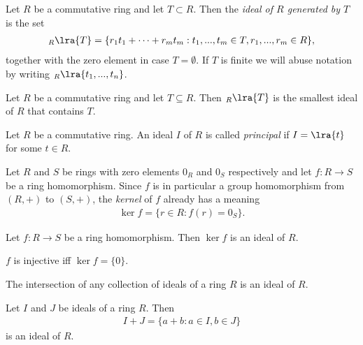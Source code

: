 \documentclass{article}
\begin{document}
\begin{definition}
    Let $R$ be a commutative ring and let $T\subset R$. Then the \emph{ideal of $R$
    generated by $T$} is the set 
    \begin{align*}
        _R\lra{T} = \{r_1t_1+\cdots+r_mt_m : t_1,...,t_m\in T,r_1,...,r_m\in R\},
    \end{align*}
    together with the zero element in case $T=\emptyset$. If $T$ is finite we will 
    abuse notation by writing $_R\lra{t_1,...,t_n}$.
\end{definition}

\begin{proposition}[Notes 3.4.14]
    Let $R$ be a commutative ring and let $T\subseteq R$. Then $_R\lra{T}$ is the 
    smallest ideal of $R$ that contains $T$. 
\end{proposition}

\begin{definition}
    Let $R$ be a commutative ring. An ideal $I$ of $R$ is called \emph{principal} if 
    $I=\lra{t}$ for some $t\in R$.
\end{definition}

\begin{definition}
    Let $R$ and $S$ be rings with zero elements $0_R$ and $0_S$ respectively and 
    let $f:R\to S$ be a ring homomorphism. Since $f$ is in particular a group homomorphism
    from $(R,+)$ to $(S,+)$, the \emph{kernel} of $f$ already has a meaning 
    \begin{align*}
        \ker f = \{r\in R : f(r) = 0_S\}.
    \end{align*}
\end{definition}

\begin{proposition}[Notes 3.4.18]
    Let $f:R\to S$ be a ring homomorphism. Then $\ker f$ is an ideal of $R$.
\end{proposition}

\begin{lemma}[Notes 3.4.20]
    $f$ is injective iff $\ker f = \{0\}$. 
\end{lemma}

\begin{lemma}[Notes 3.4.21]
    The intersection of any collection of ideals of a ring $R$ is an ideal of $R$.
\end{lemma}

\begin{lemma}[Notes 3.4.22]
    Let $I$ and $J$ be ideals of a ring $R$. Then 
    \begin{align*}
        I+J=\{a+b:a\in I, b\in J\}
    \end{align*}
    is an ideal of $R$.
\end{lemma}
\end{document}
